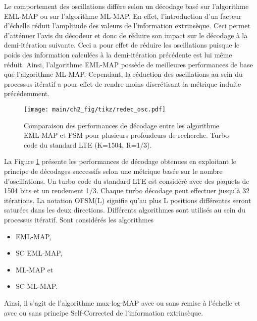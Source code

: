 Le comportement des oscillations diffère selon un décodage basé sur l'algorithme EML-MAP ou sur l'algorithme ML-MAP. En effet, 
l'introduction d'un facteur d'échelle réduit l'amplitude des valeurs de l'information extrinsèque. Ceci permet d'atténuer 
l'avis du décodeur et donc de réduire son impact sur le décodage à la demi-itération suivante. Ceci a pour effet de 
réduire les oscillations puisque le poids des information calculées à la demi-itération précédente est lui même réduit. 
Ainsi, l'algorithme EML-MAP possède de meilleures performances de base que l'algorithme ML-MAP. Cependant, la réduction 
des oscillations au sein du processus itératif a pour effet de rendre moins discrétisant la métrique induite 
précédemment.

\begin{figure}[!h]
	\centering
	\texttt{[image: main/ch2\_fig/tikz/redec\_osc.pdf]}
	\vspace*{.3cm}
	\caption{\label{fig:cmp_osc}Comparaison des performances de décodage entre les algorithme EML-MAP et FSM pour plusieurs 
	profondeurs de recherche. Turbo code du standard LTE (K=1504, R=1/3).}
\end{figure}

La Figure \ref{fig:cmp_osc} présente les performances de décodage obtenues en exploitant le principe de décodages successifs selon une 
métrique basée sur le nombre d'oscillations. Un turbo code du standard LTE est considéré avec des paquets de 1504 bits et un 
rendement 1/3. Chaque turbo décodage peut effectuer jusqu'à 32 itérations. La notation OFSM(L) signifie qu'au plus L 
positions différentes seront saturées dans les deux directions. Différents algorithmes sont utilisés au sein du
processus itératif. Sont considérés les algorithmes 
\begin{itemize}
 	\item EML-MAP,
 	\item SC EML-MAP,
 	\item ML-MAP et 
 	\item SC ML-MAP.
 \end{itemize} 
 Ainsi, il s'agit de l'algorithme 
max-log-MAP avec ou sans remise à l'échelle et avec ou sans principe Self-Corrected de l'information extrinsèque.

